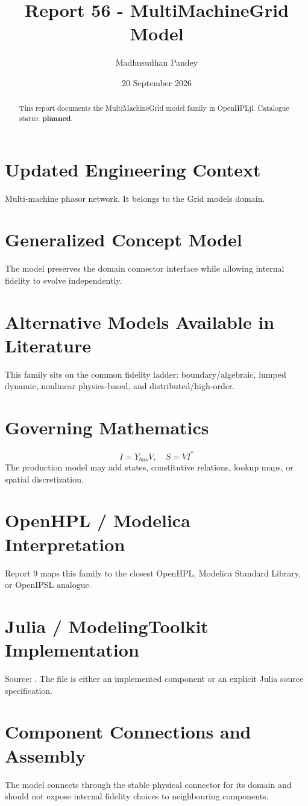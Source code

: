 \documentclass[10pt,a4paper]{article}
\title{Report 56 - MultiMachineGrid Model}
\author{Madhusudhan Pandey}
\date{20 September 2026}
\begin{document}
\maketitle
\begin{abstract}This report documents the MultiMachineGrid model family in OpenHPLjl. Catalogue status: \textbf{planned}.\end{abstract}
\section{Updated Engineering Context}Multi-machine phasor network. It belongs to the Grid models domain.
\section{Generalized Concept Model}The model preserves the domain connector interface while allowing internal fidelity to evolve independently.
\section{Alternative Models Available in Literature}This family sits on the common fidelity ladder: boundary/algebraic, lumped dynamic, nonlinear physics-based, and distributed/high-order.
\section{Governing Mathematics}\[I=Y_{bus}V,\quad S=V I^*\]The production model may add states, constitutive relations, lookup maps, or spatial discretization.
\section{OpenHPL / Modelica Interpretation}Report 9 maps this family to the closest OpenHPL, Modelica Standard Library, or OpenIPSL analogue.
\section{Julia / ModelingToolkit Implementation}Source: \texttt{}. The file is either an implemented component or an explicit Julia source specification.
\section{Component Connections and Assembly}The model connects through the stable physical connector for its domain and should not expose internal fidelity choices to neighbouring components.
\end{document}
